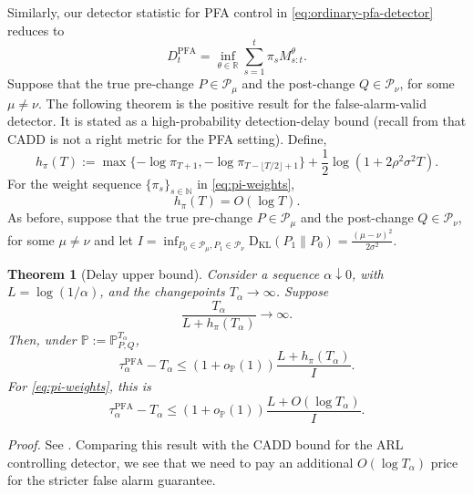 \documentclass[12pt]{article}
\theoremstyle{spaced}
\newtheorem{theorem}{Theorem}[section]
\theoremstyle{remark}
\newcommand{\N}{\mathbb N}
\newcommand{\R}{\mathbb R}
\newcommand{\bbP}{\mathbb P}
\newcommand{\KL}{\mathrm{D}_{\text{KL}}}
\begin{document}
Similarly, our detector statistic for PFA control in \eqref{eq:ordinary-pfa-detector} reduces to
\begin{equation}
\label{eq:D-def-PFA}
D_t^{\mathrm{PFA}}=\inf_{\theta\in\R}\sum_{s=1}^t \pi_sM_{s:t}^{\theta}.
\end{equation}
Suppose that the true pre-change $P\in\mathcal{P}_\mu$ and the post-change $Q\in\mathcal{P}_\nu$, for some $\mu\neq\nu$.
The following theorem is the positive result for the false-alarm-valid detector.  It is stated as a high-probability detection-delay bound (recall from  that CADD is not a right metric for the PFA setting). Define,
\begin{equation}
\label{eq:hpi-def}
  h_\pi(T)
  :=
  \max\{-\log\pi_{T+1},-\log\pi_{T-\lfloor T/2\rfloor+1}\}
  +
  \frac12\log(1+2\rho^2\sigma^2 T).
\end{equation}
For the weight sequence $\{\pi_s\}_{s\in\N}$ in \eqref{eq:pi-weights},
\begin{equation}
\label{eq:hpi-OlogT}
  h_\pi(T)=O(\log T).
\end{equation}
As before, suppose that the true pre-change $P\in\mathcal{P}_\mu$ and the post-change $Q\in\mathcal{P}_\nu$, for some $\mu\neq\nu$ and let $I=\inf_{P_0\in \mathcal{P}_\mu,P_1\in \mathcal{P}_\nu}\KL(P_1\|P_0)=\frac{(\mu-\nu)^2}{2\sigma^2}.$
\begin{theorem}[Delay upper bound]
\label{thm:subg-upper-pfa}
Consider a sequence $\alpha\downarrow 0$, with $L=\log(1/\alpha)$, and the changepoints $T_\alpha\to\infty$.  Suppose
\begin{equation}
\label{eq:late-assumption-pfa}
  \frac{ T_\alpha}{L+h_\pi(T_\alpha)}\to\infty.
\end{equation}
Then, under $\bbP:=\bbP^{T_\alpha}_{P,Q}$,
\begin{equation}
\label{eq:upper-op}
  \tau_\alpha^{\mathrm{PFA}}-T_\alpha
  \le
  (1+o_{\bbP}(1))\frac{L+h_\pi(T_\alpha)}{I}.
\end{equation}
For \eqref{eq:pi-weights}, this is
\begin{equation}
\label{eq:upper-OlogT}
  \tau_\alpha^{\mathrm{PFA}}-T_\alpha
  \le
  (1+o_{\bbP}(1))
  \frac{L+O(\log T_\alpha)}{I}.
\end{equation}
\end{theorem}
\emph{Proof.} See .
Comparing this result with the CADD bound for the ARL controlling detector, we see that we need to pay an additional $O(\log T_\alpha)$ price for the 
stricter false alarm guarantee.
\end{document}
